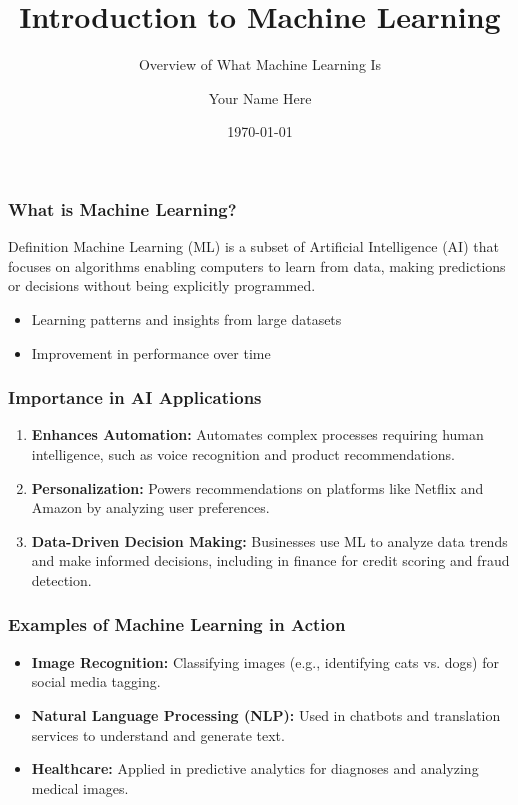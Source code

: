 \documentclass[aspectratio=169]{beamer}
\begin{document}
\frame{\titlepage}

\begin{frame}[fragile]
    \title{Introduction to Machine Learning}
    \subtitle{Overview of What Machine Learning Is}
    \author{Your Name Here}
    \date{\today}
    \titlepage
\end{frame}

\begin{frame}[fragile]
    \frametitle{What is Machine Learning?}
    \begin{block}{Definition}
        Machine Learning (ML) is a subset of Artificial Intelligence (AI) that focuses on algorithms enabling computers to learn from data, making predictions or decisions without being explicitly programmed.
    \end{block}
    \begin{itemize}
        \item Learning patterns and insights from large datasets
        \item Improvement in performance over time
    \end{itemize}
\end{frame}

\begin{frame}[fragile]
    \frametitle{Importance in AI Applications}
    \begin{enumerate}
        \item \textbf{Enhances Automation:} Automates complex processes requiring human intelligence, such as voice recognition and product recommendations.
        \item \textbf{Personalization:} Powers recommendations on platforms like Netflix and Amazon by analyzing user preferences.
        \item \textbf{Data-Driven Decision Making:} Businesses use ML to analyze data trends and make informed decisions, including in finance for credit scoring and fraud detection.
    \end{enumerate}
\end{frame}

\begin{frame}[fragile]
    \frametitle{Examples of Machine Learning in Action}
    \begin{itemize}
        \item \textbf{Image Recognition:} Classifying images (e.g., identifying cats vs. dogs) for social media tagging.
        \item \textbf{Natural Language Processing (NLP):} Used in chatbots and translation services to understand and generate text.
        \item \textbf{Healthcare:} Applied in predictive analytics for diagnoses and analyzing medical images.
    \end{itemize}
\end{frame}
\end{document}
